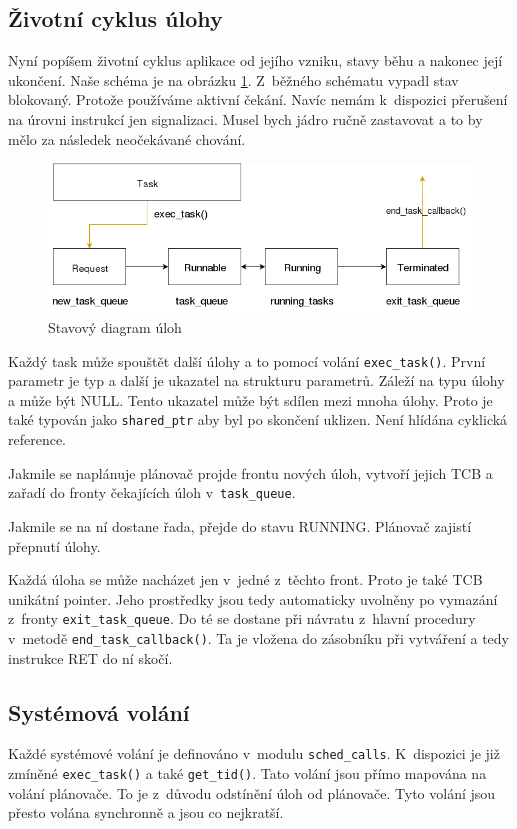 \documentclass[a4paper,12pt]{article}
\begin{document}
\subsection{Životní cyklus úlohy}
Nyní popíšem životní cyklus aplikace od jejího vzniku, stavy běhu a nakonec její
ukončení. Naše schéma je na obrázku \ref{fig:state_diagram}. Z~běžného schématu
vypadl stav blokovaný. Protože používáme aktivní čekání. Navíc nemám k~dispozici
přerušení na úrovni instrukcí jen signalizaci. Musel bych jádro ručně zastavovat a
to by mělo za následek neočekávané chování.

\begin{figure}
\centering
\includegraphics[width=\textwidth]{obrazky/state_diagram.png}
\caption{Stavový diagram úloh}
\label{fig:state_diagram}
\end{figure}

Každý task může spouštět další úlohy a to pomocí volání \verb+exec_task()+. První
parametr je typ a další je ukazatel na strukturu parametrů. Záleží na typu úlohy a
může být NULL. Tento ukazatel může být sdílen mezi mnoha úlohy. Proto je také
typován jako \verb+shared_ptr+ aby byl po skončení uklizen. Není hlídána cyklická
reference.

Jakmile se naplánuje plánovač projde frontu nových úloh, vytvoří jejich TCB a zařadí
do fronty čekajících úloh v~\verb+task_queue+.

Jakmile se na ní dostane řada, přejde do stavu RUNNING. Plánovač zajistí přepnutí úlohy.

Každá úloha se může nacházet jen v~jedné z~těchto front. Proto je také TCB unikátní pointer.
Jeho prostředky jsou tedy automaticky uvolněny po vymazání z~fronty
\verb+exit_task_queue+. Do té se dostane při návratu z~hlavní procedury v~metodě
\verb+end_task_callback()+. Ta je vložena do zásobníku při vytváření a tedy instrukce
RET do ní skočí.

\subsection{Systémová volání}
Každé systémové volání je definováno v~modulu \verb+sched_calls+. K~dispozici
je již zmíněné \verb+exec_task()+ a také \verb+get_tid()+. Tato volání jsou přímo
mapována na volání plánovače. To je z~důvodu odstínění úloh od plánovače. Tyto
volání jsou přesto volána synchronně a jsou co nejkratší.
\end{document}
